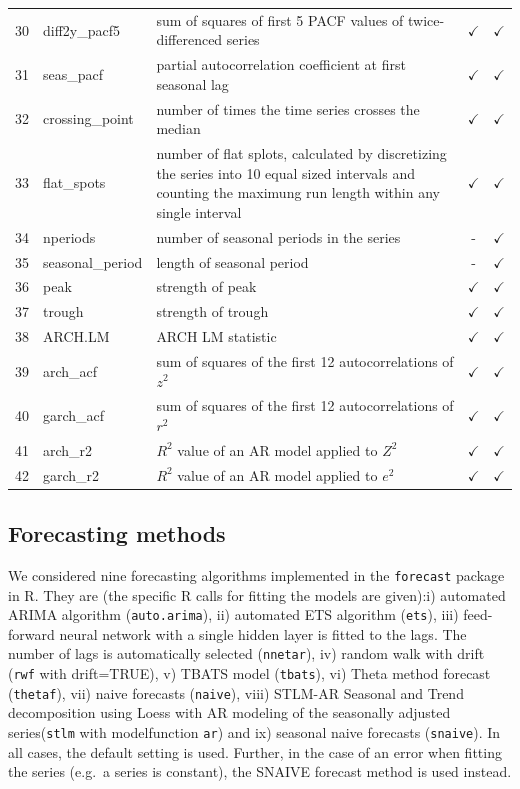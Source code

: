 \documentclass[11pt,a4paper,]{article}
\def\yes{$\checkmark$}
\theoremstyle{definition}
\theoremstyle{definition}
\theoremstyle{definition}
\theoremstyle{remark}
\begin{document}
\begin{table}[!htp]
\begin{tabular}{llp{}cc}
30 & diff2y\_pacf5  & sum of squares of first 5 PACF values of twice-differenced series                       & \yes  & \yes \\
31 & seas\_pacf  & partial autocorrelation coefficient at first seasonal lag                       & \yes  & \yes \\
32 & crossing\_point  & number of times the time series crosses the median                     & \yes  & \yes \\
33 & flat\_spots  & number of flat splots, calculated by discretizing the series into 10 equal sized intervals and counting the maximung run length within any single interval                       & \yes  & \yes \\
34 & nperiods  & number of seasonal periods in the series & -  & \yes \\
35 & seasonal\_period  & length of seasonal period                       & -  & \yes \\
36 & peak  & strength of peak                      & \yes  & \yes \\
37 & trough  & strength of trough                      & \yes  & \yes \\
38 & ARCH.LM  & ARCH LM statistic                      & \yes  & \yes \\
39 & arch\_acf  &    sum of squares of the first 12 autocorrelations of $z^2$               & \yes  & \yes \\
40 & garch\_acf  &  sum of squares of the first 12 autocorrelations of $r^2$                 & \yes  & \yes \\
41 & arch\_r2  &     $R^2$ value of an AR model applied to $Z^2$              & \yes  & \yes \\
42 & garch\_r2  &   $R^2$ value of an AR model applied to $e^2$                 & \yes  & \yes \\
\bottomrule
 \end{tabular}
\end{table}

\subsection{Forecasting methods}\label{forecasting-methods}

We considered nine forecasting algorithms implemented in the
\texttt{forecast}\autocite{forecast} package in R. They are (the
specific R calls for fitting the models are given):i) automated ARIMA
algorithm (\texttt{auto.arima}), ii) automated ETS algorithm
(\texttt{ets}), iii) feed-forward neural network with a single hidden
layer is fitted to the lags. The number of lags is automatically
selected (\texttt{nnetar}), iv) random walk with drift (\texttt{rwf}
with drift=TRUE), v) TBATS model (\texttt{tbats}), vi) Theta method
forecast (\texttt{thetaf}), vii) naive forecasts (\texttt{naive}), viii)
STLM-AR Seasonal and Trend decomposition using Loess with AR modeling of
the seasonally adjusted series(\texttt{stlm} with modelfunction
\texttt{ar}) and ix) seasonal naive forecasts (\texttt{snaive}). In all
cases, the default setting is used. Further, in the case of an error
when fitting the series (e.g.~a series is constant), the SNAIVE forecast
method is used instead.
\end{document}
